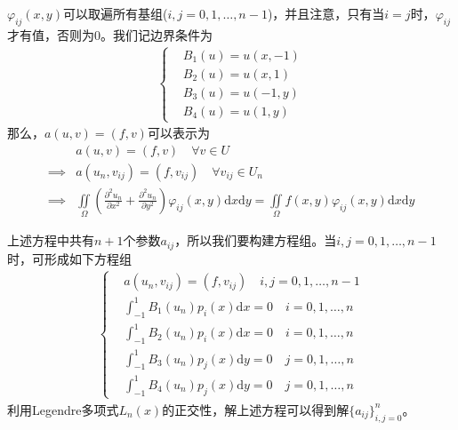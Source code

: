                 $\varphi_{ij}(x,y)$可以取遍所有基组($i,j = 0,1,\dots,n -1$)，并且注意，只有当$i = j$时，$\varphi_{ij}$才有值，否则为$0$。我们记边界条件为
                \begin{align*}
                    \left\{
                    \begin{aligned}
                        &B_1(u) = u(x,-1)\\
                        &B_2(u) = u(x,1)\\
                        &B_3(u) = u(-1,y)\\
                        &B_4(u) = u(1,y)
                    \end{aligned}
                    \right.
                \end{align*}
                那么，$a(u,v) = (f,v)$可以表示为
                \begin{align*}
                            &a(u,v) = (f,v) \quad \forall v \in U\\
                \implies {} &a(u_n,v_{ij}) = (f,v_{ij}) \quad \forall v_{ij} \in U_n\\
                \implies {} &\iint\limits_{\Omega} \left( \frac{\partial ^2 u_n}{\partial x^2} + \frac{\partial ^2 u_n}{\partial y^2} \right) \varphi_{ij}(x,y) \mathrm{d}x\mathrm{d}y = \iint\limits_{\Omega}f(x,y) \varphi_{ij}(x,y) \mathrm{d}x\mathrm{d}y
                \end{align*}
                \par
                上述方程中共有$n+1$个参数$a_{ij}$，所以我们要构建方程组。当$i,j = 0,1,\dots,n - 1$时，可形成如下方程组
                \begin{align*}
                    \left\{
                        \begin{aligned}
                        &a(u_n,v_{ij}) = (f,v_{ij})\quad i,j = 0,1,\dots,n - 1 \\
                        &\int _{-1}^1 B_1(u_n) p_i(x) \mathrm{d}x =0 \quad i = 0,1,\dots,n\\
                        &\int _{-1}^1 B_2(u_n) p_i(x) \mathrm{d}x = 0\quad i = 0,1,\dots,n\\
                        &\int _{-1}^1 B_3(u_n) p_j(x) \mathrm{d}y = 0\quad j = 0,1,\dots,n\\
                        &\int _{-1}^1 B_4(u_n) p_j(x) \mathrm{d}y =0 \quad j = 0,1,\dots,n
                        \end{aligned}
                    \right.
                \end{align*}
                利用Legendre多项式$L_n(x)$的正交性，解上述方程可以得到解$\{a_{ij}\}_{i,j = 0}^n$。

